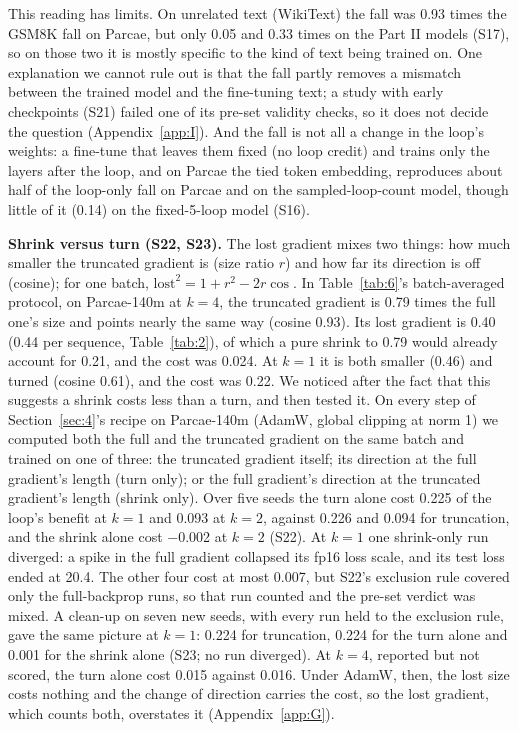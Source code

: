 \documentclass[10pt]{article}
\begin{document}
This reading has limits. On unrelated text (WikiText) the fall was 0.93 times the GSM8K fall on Parcae, but only 0.05 and 0.33 times on the Part II models (S17), so on those two it is mostly specific to the kind of text being trained on. One explanation we cannot rule out is that the fall partly removes a mismatch between the trained model and the fine-tuning text; a study with early checkpoints (S21) failed one of its pre-set validity checks, so it does not decide the question (Appendix~\ref{app:I}). And the fall is not all a change in the loop's weights: a fine-tune that leaves them fixed (no loop credit) and trains only the layers after the loop, and on Parcae the tied token embedding, reproduces about half of the loop-only fall on Parcae and on the sampled-loop-count model, though little of it (0.14) on the fixed-5-loop model (S16).

\textbf{Shrink versus turn (S22, S23).} The lost gradient mixes two things: how much smaller the truncated gradient is (size ratio $r$) and how far its direction is off (cosine); for one batch, $\mathrm{lost}^2 = 1 + r^2 - 2r\cos$. In Table~\ref{tab:6}'s batch-averaged protocol, on Parcae-140m at $k = 4$, the truncated gradient is 0.79 times the full one's size and points nearly the same way (cosine 0.93). Its lost gradient is 0.40 (0.44 per sequence, Table~\ref{tab:2}), of which a pure shrink to 0.79 would already account for 0.21, and the cost was 0.024. At $k = 1$ it is both smaller (0.46) and turned (cosine 0.61), and the cost was 0.22. We noticed after the fact that this suggests a shrink costs less than a turn, and then tested it. On every step of Section~\ref{sec:4}'s recipe on Parcae-140m (AdamW, global clipping at norm 1) we computed both the full and the truncated gradient on the same batch and trained on one of three: the truncated gradient itself; its direction at the full gradient's length (turn only); or the full gradient's direction at the truncated gradient's length (shrink only). Over five seeds the turn alone cost 0.225 of the loop's benefit at $k = 1$ and 0.093 at $k = 2$, against 0.226 and 0.094 for truncation, and the shrink alone cost $-$0.002 at $k = 2$ (S22). At $k = 1$ one shrink-only run diverged: a spike in the full gradient collapsed its fp16 loss scale, and its test loss ended at 20.4. The other four cost at most 0.007, but S22's exclusion rule covered only the full-backprop runs, so that run counted and the pre-set verdict was mixed. A clean-up on seven new seeds, with every run held to the exclusion rule, gave the same picture at $k = 1$: 0.224 for truncation, 0.224 for the turn alone and 0.001 for the shrink alone (S23; no run diverged). At $k = 4$, reported but not scored, the turn alone cost 0.015 against 0.016. Under AdamW, then, the lost size costs nothing and the change of direction carries the cost, so the lost gradient, which counts both, overstates it (Appendix~\ref{app:G}).
\end{document}
